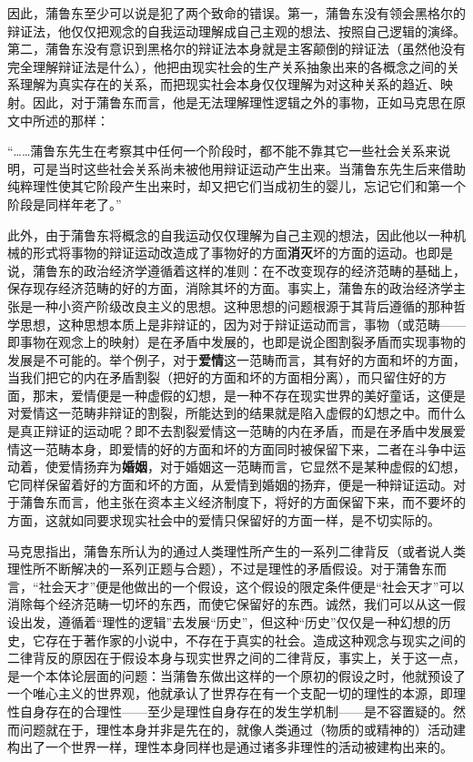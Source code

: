 \documentclass[a4paper,twoside,12pt]{ctexart}
\begin{document}
因此，蒲鲁东至少可以说是犯了两个致命的错误。第一，蒲鲁东没有领会黑格尔的辩证法，他仅仅把观念的自我运动理解成自己主观的想法、按照自己逻辑的演绎。第二，蒲鲁东没有意识到黑格尔的辩证法本身就是主客颠倒的辩证法（虽然他没有完全理解辩证法是什么），他把由现实社会的生产关系抽象出来的各概念之间的关系理解为真实存在的关系，而把现实社会本身仅仅理解为对这种关系的趋近、映射。因此，对于蒲鲁东而言，他是无法理解理性逻辑之外的事物，正如马克思在原文中所述的那样：

\begin{fangsong}
“……蒲鲁东先生在考察其中任何一个阶段时，都不能不靠其它一些社会关系来说明，可是当时这些社会关系尚未被他用辩证运动产生出来。当蒲鲁东先生后来借助纯粹理性使其它阶段产生出来时，却又把它们当成初生的婴儿，忘记它们和第一个阶段是同样年老了。”
\end{fangsong}

此外，由于蒲鲁东将概念的自我运动仅仅理解为自己主观的想法，因此他以一种机械的形式将事物的辩证运动改造成了事物好的方面\textbf{消灭}坏的方面的运动。也即是说，蒲鲁东的政治经济学遵循着这样的准则：在不改变现存的经济范畴的基础上，保存现存经济范畴的好的方面，消除其坏的方面。事实上，蒲鲁东的政治经济学主张是一种小资产阶级改良主义的思想。这种思想的问题根源于其背后遵循的那种哲学思想，这种思想本质上是非辩证的，因为对于辩证运动而言，事物（或范畴——即事物在观念上的映射）是在矛盾中发展的，也即是说企图割裂矛盾而实现事物的发展是不可能的。举个例子，对于\textbf{爱情}这一范畴而言，其有好的方面和坏的方面，当我们把它的内在矛盾割裂（把好的方面和坏的方面相分离），而只留住好的方面，那末，爱情便是一种虚假的幻想，是一种不存在现实世界的美好童话，这便是对爱情这一范畴非辩证的割裂，所能达到的结果就是陷入虚假的幻想之中。而什么是真正辩证的运动呢？即不去割裂爱情这一范畴的内在矛盾，而是在矛盾中发展爱情这一范畴本身，即爱情的好的方面和坏的方面同时被保留下来，二者在斗争中运动着，使爱情扬弃为\textbf{婚姻}，对于婚姻这一范畴而言，它显然不是某种虚假的幻想，它同样保留着好的方面和坏的方面，从爱情到婚姻的扬弃，便是一种辩证运动。对于蒲鲁东而言，他主张在资本主义经济制度下，将好的方面保留下来，而不要坏的方面，这就如同要求现实社会中的爱情只保留好的方面一样，是不切实际的。

马克思指出，蒲鲁东所认为的通过人类理性所产生的一系列二律背反（或者说人类理性所不断解决的一系列正题与合题），不过是理性的矛盾假设。对于蒲鲁东而言，“社会天才”便是他做出的一个假设，这个假设的限定条件便是“社会天才”可以消除每个经济范畴一切坏的东西，而使它保留好的东西。诚然，我们可以从这一假设出发，遵循着“理性的逻辑”去发展“历史”，但这种“历史”仅仅是一种幻想的历史，它存在于著作家的小说中，不存在于真实的社会。造成这种观念与现实之间的二律背反的原因在于假设本身与现实世界之间的二律背反，事实上，关于这一点，是一个本体论层面的问题：当蒲鲁东做出这样的一个原初的假设之时，他就预设了一个唯心主义的世界观，他就承认了世界存在有一个支配一切的理性的本源，即理性自身存在的合理性——至少是理性自身存在的发生学机制——是不容置疑的。然而问题就在于，理性本身并非是先在的，就像人类通过（物质的或精神的）活动建构出了一个世界一样，理性本身同样也是通过诸多非理性的活动被建构出来的。
\end{document}
